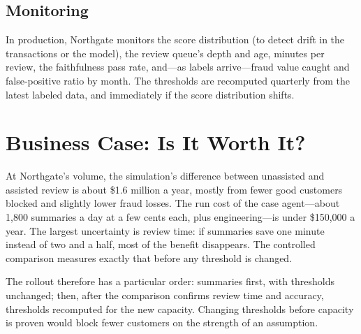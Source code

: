 \subsection{Monitoring}

In production, Northgate monitors the score distribution (to detect drift in the transactions or the model), the review queue's depth and age, minutes per review, the faithfulness pass rate, and---as labels arrive---fraud value caught and false-positive ratio by month. The thresholds are recomputed quarterly from the latest labeled data, and immediately if the score distribution shifts.

\section{Business Case: Is It Worth It?}
\label{sec:fr-business}

At Northgate's volume, the simulation's difference between unassisted and assisted review is about \$1.6 million a year, mostly from fewer good customers blocked and slightly lower fraud losses. The run cost of the case agent---about 1{,}800 summaries a day at a few cents each, plus engineering---is under \$150{,}000 a year. The largest uncertainty is review time: if summaries save one minute instead of two and a half, most of the benefit disappears. The controlled comparison measures exactly that before any threshold is changed.

The rollout therefore has a particular order: summaries first, with thresholds unchanged; then, after the comparison confirms review time and accuracy, thresholds recomputed for the new capacity. Changing thresholds before capacity is proven would block fewer customers on the strength of an assumption.

